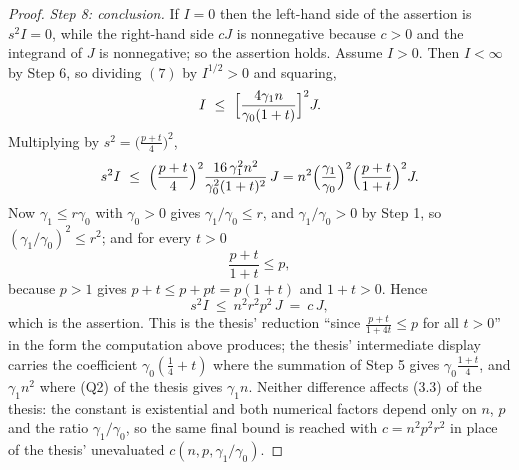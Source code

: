\begin{proof}
\emph{Step 8: conclusion.}  If $I=0$ then the left-hand side of the assertion is
$s^2I=0$, while the right-hand side $cJ$ is nonnegative because $c>0$ and the
integrand of $J$ is nonnegative; so the assertion holds.  Assume $I>0$.  Then
$I<\infty$ by Step 6, so dividing $(7)$ by $I^{1/2}>0$ and squaring,
\[
I\ \le\ \Bigl[\frac{4\gamma_1n}{\gamma_0(1+t)}\Bigr]^2J .
\]
Multiplying by $s^2=\bigl(\tfrac{p+t}4\bigr)^2$,
\[
s^2I\ \le\ \Bigl(\frac{p+t}4\Bigr)^2\frac{16\,\gamma_1^2n^2}{\gamma_0^2(1+t)^2}\,J
= n^2\Bigl(\frac{\gamma_1}{\gamma_0}\Bigr)^2\Bigl(\frac{p+t}{1+t}\Bigr)^2J .
\]
Now $\gamma_1\le r\gamma_0$ with $\gamma_0>0$ gives $\gamma_1/\gamma_0\le r$, and
$\gamma_1/\gamma_0>0$ by Step 1, so $(\gamma_1/\gamma_0)^2\le r^2$; and for every
$t>0$
\[
\frac{p+t}{1+t}\le p ,
\]
because $p>1$ gives $p+t\le p+pt=p(1+t)$ and $1+t>0$.  Hence
\[
s^2I\ \le\ n^2r^2p^2\,J\ =\ c\,J ,
\]
which is the assertion.  This is the thesis' reduction ``since
$\frac{p+t}{1+4t}\le p$ for all $t>0$'' in the form the computation above
produces; the thesis' intermediate display carries the coefficient
$\gamma_0(\frac14+t)$ where the summation of Step 5 gives
$\gamma_0\frac{1+t}4$, and $\gamma_1n^2$ where (Q2) of the thesis gives $\gamma_1n$.
Neither difference affects (3.3) of the thesis: the constant is existential and both
numerical factors depend only on $n$, $p$ and the ratio $\gamma_1/\gamma_0$, so
the same final bound is reached with $c=n^2p^2r^2$ in place of the thesis'
unevaluated $c(n,p,\gamma_1/\gamma_0)$.
\end{proof}
